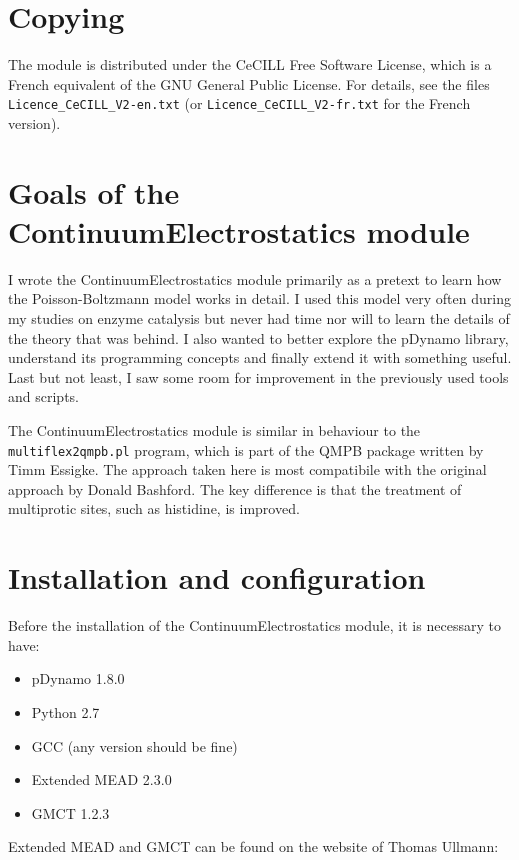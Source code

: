 \documentclass[a4paper,11pt]{article}
\newcommand{\modulename}{ContinuumElectrostatics\xspace}
\begin{document}
\section{Copying}
The module is distributed under the CeCILL Free Software License, which is
a French equivalent of the GNU General Public License.
%
For details, see the files \texttt{Licence\_CeCILL\_V2-en.txt} (or 
\texttt{Licence\_CeCILL\_V2-fr.txt} for the French version).


\section{Goals of the \modulename module}
I wrote the \modulename module primarily as a pretext to learn how 
the Poisson-Boltzmann model works in detail.
%
I used this model very often during my studies on enzyme catalysis but never had 
time nor will to learn the details of the theory that was behind.
%
I also wanted to better explore the pDynamo library, understand its programming
concepts and finally extend it with something useful.
%
Last but not least, I saw some room for improvement in the previously used 
tools and scripts. 

The \modulename module is similar in behaviour to the \texttt{multiflex2qmpb.pl} 
program, which is part of the QMPB package written by Timm Essigke.
%
The approach taken here is most compatibile with the original approach 
by Donald Bashford.
%
The key difference is that the treatment of multiprotic sites, such as histidine,
is improved.


% 


\section{Installation and configuration}
Before the installation of the \modulename module, it is necessary 
to have:
\begin{itemize}
  \setlength{\itemsep}{2pt}
  \item pDynamo 1.8.0
  \item Python 2.7
  \item GCC (any version should be fine)
  \item Extended MEAD 2.3.0
  \item GMCT 1.2.3
\end{itemize}
%
Extended MEAD and GMCT can be found on the website of Thomas Ullmann:
\end{document}
